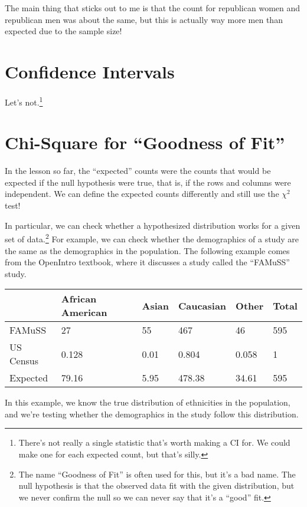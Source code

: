 \documentclass[
  letterpaper,
  DIV=11,
  numbers=noendperiod]{scrreprt}
\begin{document}
The main thing that sticks out to me is that the count for republican
women and republican men was about the same, but this is actually way
more men than expected due to the sample size!

\hypertarget{confidence-intervals-2}{%
\section{Confidence Intervals}\label{confidence-intervals-2}}

Let's not.\footnote{There's not really a single statistic that's worth
  making a CI for. We could make one for each expected count, but that's
  silly.}

\hypertarget{chi-square-for-goodness-of-fit}{%
\section{Chi-Square for ``Goodness of
Fit''}\label{chi-square-for-goodness-of-fit}}

In the lesson so far, the ``expected'' counts were the counts that would
be expected if the null hypothesis were true, that is, if the rows and
columns were independent. We can define the expected counts differently
and still use the \(\chi^2\) test!

In particular, we can check whether a hypothesized distribution works
for a given set of data.\footnote{The name ``Goodness of Fit'' is often
  used for this, but it's a bad name. The null hypothesis is that the
  observed data fit with the given distribution, but we never confirm
  the null so we can never say that it's a ``good'' fit.} For example,
we can check whether the demographics of a study are the same as the
demographics in the population. The following example comes from the
OpenIntro textbook, where it discusses a study called the ``FAMuSS''
study.

\begin{longtable}[]{@{}llllll@{}}
\toprule\noalign{}
& African American & Asian & Caucasian & Other & Total \\
\midrule\noalign{}
\endhead
\bottomrule\noalign{}
\endlastfoot
FAMuSS & 27 & 55 & 467 & 46 & 595 \\
US Census & 0.128 & 0.01 & 0.804 & 0.058 & 1 \\
Expected & 79.16 & 5.95 & 478.38 & 34.61 & 595 \\
\end{longtable}

In this example, we know the true distribution of ethnicities in the
population, and we're testing whether the demographics in the study
follow this distribution.
\end{document}

